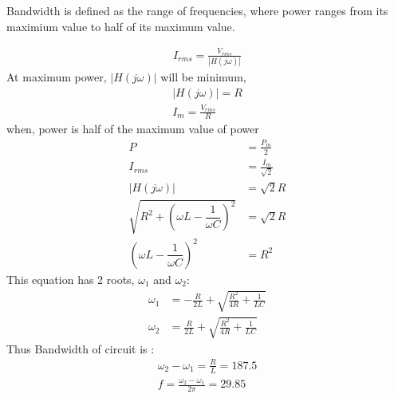 \documentclass[journal,12pt,onecolumn]{IEEEtran}
\providecommand{\brak}[1]{\ensuremath{\left(#1\right)}}
\theoremstyle{remark}
\providecommand{\abs}[1]{\left\vert#1\right\vert}
\begin{document}
Bandwidth is defined as the range of frequencies, where power ranges from its maximium value to half of its maximum value.

\begin{align}
I_{rms} = \frac{V_{rms}}{\abs{H\brak{j\omega}}}      
\end{align}
At maximum power, $\abs{H\brak{j\omega}}$ will be minimum,
\begin{align}
\abs{H\brak{j\omega}} = R\\
I_{m} = \frac{V_{rms}}{R}
\end{align}
when, power is half of the maximum value of power
\begin{align}
P &= \frac{P_{m}}{2}\\
I_{rms} &= \frac{I_{m}}{\sqrt{2}}\\
\abs{H\brak{j\omega}}&=\sqrt{2}R\\
\sqrt{R^2 + \left(\omega L - \dfrac{1}{\omega C}\right)^2} &= \sqrt{2} R\\
\left(\omega L - \dfrac{1}{\omega C}\right)^2 &= R^{2}
\end{align}
This equation has 2 roots, $\omega_{1}$ and $\omega_{2}$:
\begin{align}
\omega_{1} &= -\frac{R}{2L} + \sqrt{\frac{R^{2}}{4R}+\frac{1}{LC}}\\
\omega_{2} &= \frac{R}{2L} + \sqrt{\frac{R^{2}}{4R}+\frac{1}{LC}}
\end{align}
Thus Bandwidth of circuit is :
\begin{align}
\omega_{2}-\omega_{1} = \frac{R}{L} = 187.5\\
f = \frac{\omega_{2}-\omega_{1}}{2\pi} = 29.85 
\end{align}

\end{document}

